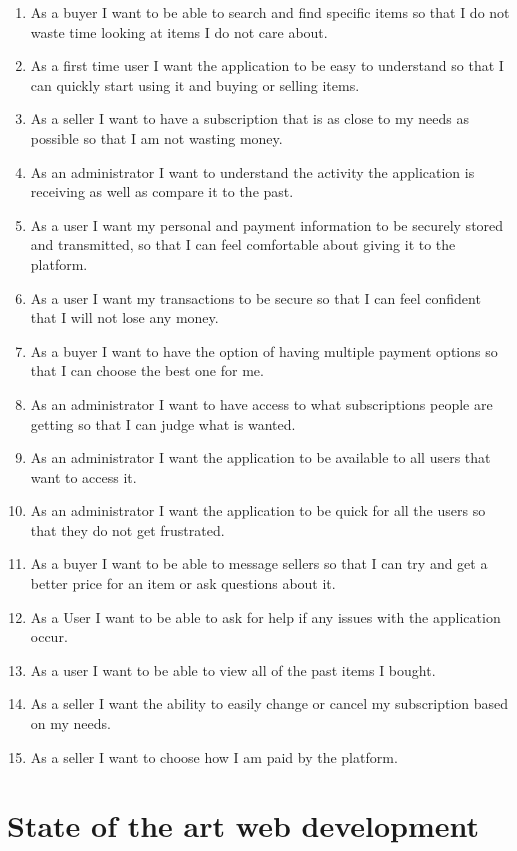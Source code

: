 \documentclass[]{project_report}
\begin{document}
\begin{enumerate}
    \item As a buyer I want to be able to search and find specific items so that I do not waste time looking at items I do not care about.
    \item As a first time user I want the application to be easy to understand so that I can quickly start using it and buying or selling items.
    \item As a seller I want to have a subscription that is as close to my needs as possible so that I am not wasting money.
    \item As an administrator I want to understand the activity the application is receiving as well as compare it to the past.
    \item As a user I want my personal and payment information to be securely stored and transmitted, so that I can feel comfortable about giving it to the platform.
    \item As a user I want my transactions to be secure so that I can feel confident that I will not lose any money.
    \item As a buyer I want to have the option of having multiple payment options so that I can choose the best one for me.
    \item As an administrator I want to have access to what subscriptions people are getting so that I can judge what is wanted.
    \item As an administrator I want the application to be available to all users that want to access it.
    \item As an administrator I want the application to be quick for all the users so that they do not get frustrated. 
    \item As a buyer I want to be able to message sellers so that I can try and get a better price for an item or ask questions about it.
    \item As a User I want to be able to ask for help if any issues with the application occur.
    \item As a user I want to be able to view all of the past items I bought.
    \item As a seller I want the ability to easily change or cancel my subscription based on my needs. 
    \item As a seller I want to choose how I am paid by the platform.
\end{enumerate}

\chapter{State of the art web development}
\end{document}
